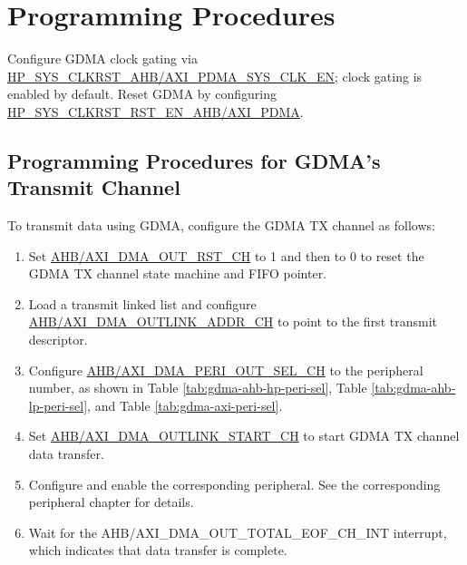 \documentclass[main\_\_EN.tex]{subfiles}
\begin{document}
\section{Programming Procedures}

Configure GDMA clock gating via \hyperref[fielddesc:HPSYSCLKRSTAHBPDMASYSCLKEN]{HP\_SYS\_CLKRST\_AHB/AXI\_PDMA\_SYS\_CLK\_EN}; clock gating is enabled by default. Reset GDMA by configuring \hyperref[fielddesc:HPSYSCLKRSTRSTENAHBPDMA]{HP\_SYS\_CLKRST\_RST\_EN\_AHB/AXI\_PDMA}.

\subsection{Programming Procedures for GDMA's Transmit Channel}

To transmit data using GDMA, configure the GDMA TX channel as follows:
\begin{enumerate}
    \item Set \hyperref[fielddesc:AHBDMAOUTRSTCHN]{AHB/AXI\_DMA\_OUT\_RST\_CH} to 1 and then to 0 to reset the GDMA TX channel state machine and FIFO pointer.
    \item Load a transmit linked list and configure \hyperref[fielddesc:AHBDMAOUTLINKADDRCHN]{AHB/AXI\_DMA\_OUTLINK\_ADDR\_CH} to point to the first transmit descriptor.
    \item Configure \hyperref[fielddesc:AHBDMAPERIOUTSELCHN]{AHB/AXI\_DMA\_PERI\_OUT\_SEL\_CH} to the peripheral number, as shown in Table \ref{tab:gdma-ahb-hp-peri-sel}, Table \ref{tab:gdma-ahb-lp-peri-sel}, and Table \ref{tab:gdma-axi-peri-sel}.
    \item Set \hyperref[fielddesc:AHBDMAOUTLINKSTARTCHN]{AHB/AXI\_DMA\_OUTLINK\_START\_CH} to start GDMA TX channel data transfer.
    \item Configure and enable the corresponding peripheral. See the corresponding peripheral chapter for details.
    \item Wait for the AHB/AXI\_DMA\_OUT\_TOTAL\_EOF\_CH\_INT interrupt, which indicates that data transfer is complete.
\end{enumerate}
\end{document}
